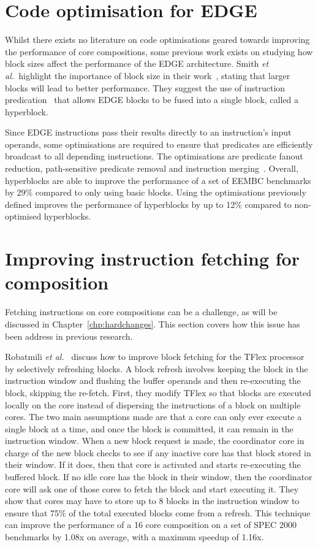 \section{Code optimisation for EDGE}

Whilst there exists no literature on code optimisations geared towards improving the performance of core compositions, some previous work exists on studying how block sizes affect the performance of the EDGE architecture.
Smith {\it et al.~}highlight the importance of block size in their work~\cite{smith2006edge}, stating that larger blocks will lead to better performance.
They suggest the use of instruction predication~\cite{smith2006dataflowpred} that allows EDGE blocks to be fused into a single block, called a hyperblock.

Since EDGE instructions pass their results directly to an instruction's input operands, some optimisations are required to ensure that predicates are efficiently broadcast to all depending instructions.
The optimisations are predicate fanout reduction, path-sensitive predicate removal and instruction merging~\cite{smith2006dataflowpred}.
Overall, hyperblocks are able to improve the performance of a set of EEMBC benchmarks by 29\% compared to only using basic blocks.
Using the optimisations previously defined improves the performance of hyperblocks by up to 12\% compared to non-optimised hyperblocks.
\vspace{-1em}
\section{Improving instruction fetching for composition}
Fetching instructions on core compositions can be a challenge, as will be discussed in Chapter~\ref{chp:hardchanges}.
This section covers how this issue has been address in previous research.

Robatmili {\it et al.~}\cite{robatmili2011uniproc} discuss how to improve block fetching for the TFlex processor by selectively refreshing blocks.
A block refresh involves keeping the block in the instruction window and flushing the buffer operands and then re-executing the block, skipping the re-fetch.
First, they modify TFlex so that blocks are executed locally on the core instead of dispersing the instructions of a block on multiple cores.
The two main assumptions made are that a core can only ever execute a single block at a time, and once the block is committed, it can remain in the instruction window.
When a new block request is made, the coordinator core in charge of the new block checks to see if any inactive core has that block stored in their window.
If it does, then that core is activated and starts re-executing the buffered block.
If no idle core has the block in their window, then the coordinator core will ask one of those cores to fetch the block and start executing it.
They show that cores may have to store up to 8 blocks in the instruction window to ensure that 75\% of the total executed blocks come from a refresh.
This technique can improve the performance of a 16 core composition on a set of SPEC 2000 benchmarks by 1.08x on average, with a maximum speedup of 1.16x.

